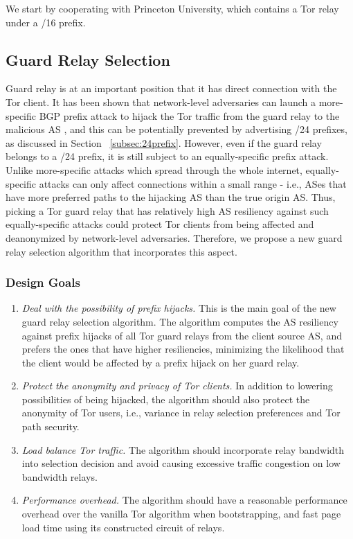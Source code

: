 We start by cooperating with Princeton University, which contains a Tor relay under a /16 prefix. 

\subsection{Guard Relay Selection}
\label{subsec:relayselection}

Guard relay is at an important position that it has direct connection with the Tor client. It has been shown that network-level adversaries can launch a more-specific BGP prefix attack to hijack the Tor traffic from the guard relay to the malicious AS \cite{sun2015raptor}, and this can be potentially prevented by advertising /24 prefixes, as discussed in Section ~\ref{subsec:24prefix}. However, even if the guard relay belongs to a /24 prefix, it is still subject to an equally-specific prefix attack. Unlike more-specific attacks which spread through the whole internet, equally-specific attacks can only affect connections within a small range - i.e., ASes that have more preferred paths to the hijacking AS than the true origin AS. Thus, picking a Tor guard relay that has relatively high AS resiliency against such equally-specific attacks could protect Tor clients from being affected and deanonymized by network-level adversaries. Therefore, we propose a new guard relay selection algorithm that incorporates this aspect.

\subsubsection{Design Goals}
\begin{enumerate}
\item \emph{Deal with the possibility of prefix hijacks.} This is the main goal of the new guard relay selection algorithm. The algorithm computes the AS resiliency against prefix hijacks of all Tor guard relays from the client source AS, and prefers the ones that have higher resiliencies, minimizing the likelihood that the client would be affected by a prefix hijack on her guard relay. 
\item \emph{Protect the anonymity and privacy of Tor clients.} In addition to lowering possibilities of being hijacked, the algorithm should also protect the anonymity of Tor users, i.e., variance in relay selection preferences and Tor path security. 
\item \emph{Load balance Tor traffic.} The algorithm should incorporate relay bandwidth into selection decision and avoid causing excessive traffic congestion on low bandwidth relays. 
\item \emph{Performance overhead.} The algorithm should have a reasonable performance overhead over the vanilla Tor algorithm when bootstrapping, and fast page load time using its constructed circuit of relays. 
\end{enumerate}

